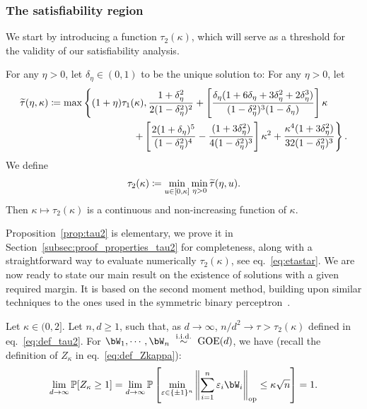 \subsubsection{The satisfiability region}

We start by introducing a function $\tau_2(\kappa)$, which will serve as a threshold for the validity of our satisfiability analysis.
\begin{proposition}\label{prop:tau2}
   For any $\eta > 0$, let $\delta_\eta \in (0,1)$ to be the unique solution to:
    For any $\eta > 0$, let 
\begin{align}
    \nonumber
        \label{eq:def_ttau}
        \ttau(\eta,\kappa) &\coloneqq \max\left\{(1+\eta) \tau_1(\kappa), 
\frac{1+\delta_\eta^2}{2(1-\delta_\eta^2)^2}
    + \left[\frac{\delta_\eta(1+6\delta_\eta+3\delta_\eta^2+2\delta_\eta^3)}{(1-\delta_\eta^2)^3(1-\delta_\eta)}\right] \kappa \right.\\
    &
    \left.
     \hspace{3cm} + \left[ \frac{2(1+\delta_\eta)^5}{(1-\delta_\eta^2)^4} - \frac{(1+3 \delta_\eta^2)}{4(1-\delta_\eta^2)^3}\right] \kappa^2 
      + \frac{\kappa^4(1+3\delta_\eta^2)}{32(1-\delta_\eta^2)^3}
\right\}.
\end{align}
    We define
    \begin{equation}
        \label{eq:def_tau2}
        \tau_2(\kappa) \coloneqq \min_{u \in [0,\kappa]} \min_{\eta > 0} {\widetilde{\tau}}(\eta, u).
    \end{equation}
    Then $\kappa \mapsto \tau_2(\kappa)$ is a continuous and non-increasing function of $\kappa$.
\end{proposition}
\noindent
Proposition~\ref{prop:tau2} is elementary, we prove it in Section~\ref{subsec:proof_properties_tau2} for completeness, along 
with a straightforward way to evaluate numerically $\tau_2(\kappa)$, see eq.~\eqref{eq:etastar}.
We are now ready to state our main result on the existence of solutions with a given required margin.
It is based on the second moment method, building upon similar techniques to the ones used in the symmetric binary perceptron~\citep{aubin2019storage}.
\begin{theorem}\label{thm:second_moment}
    Let $\kappa \in (0, 2]$. 
    Let $n,d \geq 1$, such that, as $d \to \infty$, $n/d^2 \to \tau > \tau_2(\kappa)$ defined in eq.~\eqref{eq:def_tau2}. 
    For $\bW_1, \cdots, \bW_n~\iid~\GOE(d)$, we have (recall the definition of $Z_\kappa$ in eq.~\eqref{eq:def_Zkappa}):
    \begin{equation*}
        \lim_{d \to \infty} \bbP[Z_\kappa \geq 1] = \lim_{d \to \infty} \bbP\left[\min_{\eps \in \{\pm 1\}^n} \left\|\sum_{i=1}^n \eps_i \bW_i \right\|_\op \leq \kappa \sqrt{n}\right] = 1.
    \end{equation*} 
\end{theorem}
